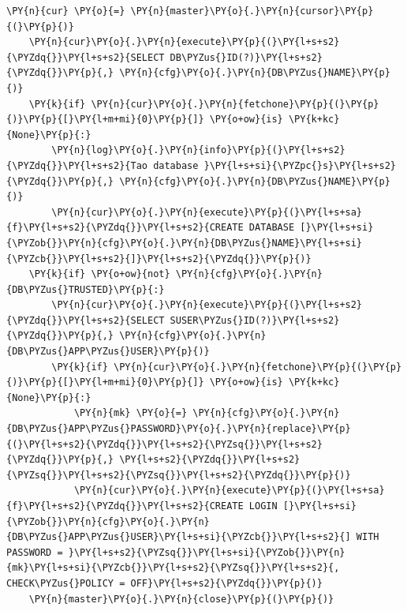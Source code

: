 \begin{Verbatim}[commandchars=\\\{\},frame=single,framerule=0.3pt,rulecolor=\color{black!40},fontsize=\footnotesize,breaklines=true]
    \PY{n}{cur} \PY{o}{=} \PY{n}{master}\PY{o}{.}\PY{n}{cursor}\PY{p}{(}\PY{p}{)}
    \PY{n}{cur}\PY{o}{.}\PY{n}{execute}\PY{p}{(}\PY{l+s+s2}{\PYZdq{}}\PY{l+s+s2}{SELECT DB\PYZus{}ID(?)}\PY{l+s+s2}{\PYZdq{}}\PY{p}{,} \PY{n}{cfg}\PY{o}{.}\PY{n}{DB\PYZus{}NAME}\PY{p}{)}
    \PY{k}{if} \PY{n}{cur}\PY{o}{.}\PY{n}{fetchone}\PY{p}{(}\PY{p}{)}\PY{p}{[}\PY{l+m+mi}{0}\PY{p}{]} \PY{o+ow}{is} \PY{k+kc}{None}\PY{p}{:}
        \PY{n}{log}\PY{o}{.}\PY{n}{info}\PY{p}{(}\PY{l+s+s2}{\PYZdq{}}\PY{l+s+s2}{Tao database }\PY{l+s+si}{\PYZpc{}s}\PY{l+s+s2}{\PYZdq{}}\PY{p}{,} \PY{n}{cfg}\PY{o}{.}\PY{n}{DB\PYZus{}NAME}\PY{p}{)}
        \PY{n}{cur}\PY{o}{.}\PY{n}{execute}\PY{p}{(}\PY{l+s+sa}{f}\PY{l+s+s2}{\PYZdq{}}\PY{l+s+s2}{CREATE DATABASE [}\PY{l+s+si}{\PYZob{}}\PY{n}{cfg}\PY{o}{.}\PY{n}{DB\PYZus{}NAME}\PY{l+s+si}{\PYZcb{}}\PY{l+s+s2}{]}\PY{l+s+s2}{\PYZdq{}}\PY{p}{)}
    \PY{k}{if} \PY{o+ow}{not} \PY{n}{cfg}\PY{o}{.}\PY{n}{DB\PYZus{}TRUSTED}\PY{p}{:}
        \PY{n}{cur}\PY{o}{.}\PY{n}{execute}\PY{p}{(}\PY{l+s+s2}{\PYZdq{}}\PY{l+s+s2}{SELECT SUSER\PYZus{}ID(?)}\PY{l+s+s2}{\PYZdq{}}\PY{p}{,} \PY{n}{cfg}\PY{o}{.}\PY{n}{DB\PYZus{}APP\PYZus{}USER}\PY{p}{)}
        \PY{k}{if} \PY{n}{cur}\PY{o}{.}\PY{n}{fetchone}\PY{p}{(}\PY{p}{)}\PY{p}{[}\PY{l+m+mi}{0}\PY{p}{]} \PY{o+ow}{is} \PY{k+kc}{None}\PY{p}{:}
            \PY{n}{mk} \PY{o}{=} \PY{n}{cfg}\PY{o}{.}\PY{n}{DB\PYZus{}APP\PYZus{}PASSWORD}\PY{o}{.}\PY{n}{replace}\PY{p}{(}\PY{l+s+s2}{\PYZdq{}}\PY{l+s+s2}{\PYZsq{}}\PY{l+s+s2}{\PYZdq{}}\PY{p}{,} \PY{l+s+s2}{\PYZdq{}}\PY{l+s+s2}{\PYZsq{}}\PY{l+s+s2}{\PYZsq{}}\PY{l+s+s2}{\PYZdq{}}\PY{p}{)}
            \PY{n}{cur}\PY{o}{.}\PY{n}{execute}\PY{p}{(}\PY{l+s+sa}{f}\PY{l+s+s2}{\PYZdq{}}\PY{l+s+s2}{CREATE LOGIN [}\PY{l+s+si}{\PYZob{}}\PY{n}{cfg}\PY{o}{.}\PY{n}{DB\PYZus{}APP\PYZus{}USER}\PY{l+s+si}{\PYZcb{}}\PY{l+s+s2}{] WITH PASSWORD = }\PY{l+s+s2}{\PYZsq{}}\PY{l+s+si}{\PYZob{}}\PY{n}{mk}\PY{l+s+si}{\PYZcb{}}\PY{l+s+s2}{\PYZsq{}}\PY{l+s+s2}{, CHECK\PYZus{}POLICY = OFF}\PY{l+s+s2}{\PYZdq{}}\PY{p}{)}
    \PY{n}{master}\PY{o}{.}\PY{n}{close}\PY{p}{(}\PY{p}{)}


\end{Verbatim}
